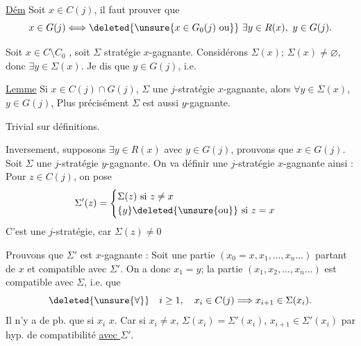 \uline{Dém}  Soit $x\in C(j)$, il faut prouver que
\[
x\in G(j)\Longleftrightarrow\deleted{\unsure{x\in G_0(j)\ \text{ou}}}\ \exists y\in R(x),\ y\in G(j).
\]

Soit $x\in C\setminus C_0$ , soit $\Sigma$ stratégie  $x$-gagnante. Considérons $\Sigma(x)$;   $\Sigma(x)\ne\varnothing$, donc $\exists y\in\Sigma(x)$. Je dis que $y\in G(j)$, i.e.

\uline{Lemme} Si $x\in C(j)\cap G(j)$, $\Sigma$ une $j$-stratégie $x$-gagnante, alors $\forall y\in\Sigma(x)$,  $y\in G(j)$,  Plus précisément $\Sigma$ est aussi $y$-gagnante.

Trivial sur définitions.

Inversement, supposons $\exists y\in R(x)$ avec $y\in G(j)$, prouvons que $x\in G(j)$. Soit $\Sigma$ une $j$-stratégie $y$-gagnante. On va  définir une $j$-stratégie  $x$-gagnante ainsi : Pour $z\in C(j)$, on pose
\[
\Sigma'(z)=\begin{cases}\Sigma(z)\text{ si }z\ne x\\ \{y\}\deleted{\unsure{\text{ou}}}\text{ si }z=x\end{cases}
\]
C'est une $j$-stratégie, car  $\Sigma(z)\ne0$  

Prouvons que $\Sigma'$ est $x$-gagnante : Soit une partie $(x_0=x,x_1,\ldots,x_n\ldots)$ partant de $x$ et compatible avec $\Sigma'$. On a donc $x_1=y$;  la partie $(x_1,x_2,\ldots,x_n\ldots)$  est compatible avec $\Sigma$, i.e. que
\[
\deleted{\unsure{\forall}}\quad i\geq1,\quad x_i\in C(j)\Longrightarrow x_{i+1}\in\Sigma(x_i).
\]
Il n'y a de pb. que si  $x_i$ \unsure{$\in$} $x$. Car si $x_i\ne x$, $\Sigma(x_i)=\Sigma'(x_i)$,  $x_{i+1}\in\Sigma'(x_i)$ par hyp. de compatibilité \uline{avec $\Sigma'$}.

